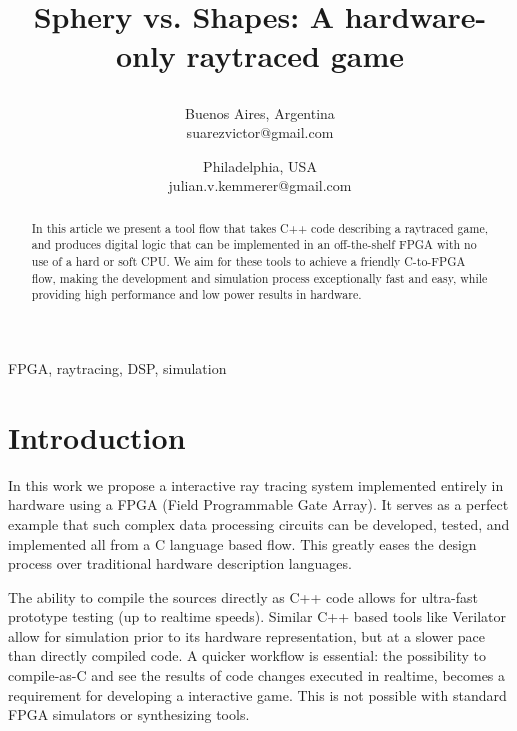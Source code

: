 \documentclass[conference]{IEEEtran}
\begin{document}
\title{Sphery vs. Shapes: A hardware-only raytraced game\\

\author{
Buenos Aires, Argentina \\
suarezvictor@gmail.com
\and
{}
Philadelphia, USA \\
julian.v.kemmerer@gmail.com
}}

\maketitle

\begin{abstract}
In this article we present a tool flow that takes C++ code describing a raytraced game, and produces digital logic that can be implemented in an off-the-shelf FPGA with no use of a hard or soft CPU. We aim for these tools to achieve a friendly C-to-FPGA flow, making the development and simulation process exceptionally fast and easy, while providing high performance and low power results in hardware.
\end{abstract}

\begin{IEEEkeywords}
FPGA, raytracing, DSP, simulation
\end{IEEEkeywords}

\section{Introduction}
In this work we propose a interactive ray tracing system implemented entirely in hardware using a FPGA (Field Programmable Gate Array). It  serves as a perfect example that such complex data processing circuits can be developed, tested, and implemented all from a C language based flow. This greatly eases the design process over traditional hardware description languages.

The ability to compile the sources directly as C++ code allows for ultra-fast prototype testing (up to realtime speeds). Similar C++ based tools like Verilator\cite{verilator} allow for simulation prior to its hardware representation, but at a slower pace than directly compiled code. A quicker workflow is essential: the possibility to compile-as-C and see the results of code changes executed in realtime, becomes a requirement for developing a interactive game. This is not possible with standard FPGA simulators or synthesizing tools.
\end{document}
